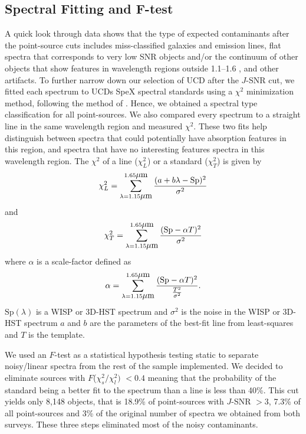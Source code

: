 \documentclass[manuscript]{aastex63}
\begin{document}
\subsection{Spectral Fitting and F-test}\label{sec:classification}
A quick look through data shows that the type of expected contaminants after the point-source cuts includes miss-classified galaxies and emission lines, flat spectra that corresponds to very low SNR objects and/or the continuum of other objects that show features in wavelength regions outside 1.1--1.6 \micron, and other artifacts. To further narrow down our selection of UCD after the $J$-SNR cut, we fitted each spectrum to UCDs SpeX spectral standards using a $\chi^2$ minimization method, following the method of \cite{2010ApJS..190..100K}. Hence, we obtained a spectral type classification for all point-sources. We also compared every spectrum to a straight line in the same wavelength region and measured $\chi^2$. These two fits help distinguish between spectra that could potentially have absorption features in this region, and spectra that have no interesting features spectra in this wavelength region. The  $\chi^2 $ of a line ($\chi^2 _L $) or a standard ($\chi^2 _T $) is given by 
\begin{equation}
\chi^2 _L  = \sum _{\lambda = 1.15 \micron} ^{ 1.65 \micron} \frac{(a + b \lambda-\text{Sp} )^2}{ \sigma ^2 }
\end{equation} 
and
\begin{equation}
\chi^2_T= \sum _{\lambda = 1.15 \micron} ^{ 1.65 \micron} \frac{(\text{Sp}  - \alpha T)^2}{ \sigma ^2 }
\end{equation} 
where $\alpha$ is a scale-factor defined as 
\begin{equation}\alpha= \sum _{\lambda = 1.15 \micron} ^{ 1.65 \micron} \frac{(\text{Sp} - \alpha T)^2}{\frac{T^2}{\sigma ^2 }}.
\end{equation} $\text{Sp}  (\lambda)$ is a WISP or 3D-HST spectrum and $\sigma ^2 $ is the noise in the WISP or 3D-HST spectrum $a$ and $b$ are the parameters of the best-fit line from least-squares and $T$ is the template.

We used an $F$-test as a statistical hypothesis testing static to separate noisy/linear spectra from the rest of the sample implemented. We decided to eliminate sources with $F$($\chi^2_s/ \chi ^2 _l)$ $< 0.4$ meaning that the probability of the standard being a better fit to the spectrum than a line is less than 40\%. This cut yields only 8,148 objects, that is 18.9\% of point-sources with $J$-SNR $>3$, 7.3\% of all point-sources and 3\% of the original number of spectra we obtained from both surveys. These three steps eliminated most of the noisy contaminants.
\end{document}
